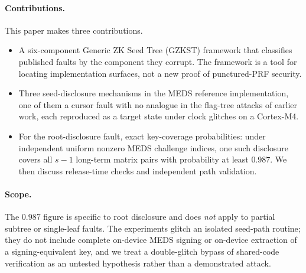 \paragraph{Contributions.}
This paper makes three contributions.
\begin{itemize}[leftmargin=*]
  \item A six-component Generic ZK Seed Tree (GZKST) framework that classifies
        published faults by the component they corrupt. The framework is a tool
        for locating implementation surfaces, not a new proof of punctured-PRF
        security.
  \item Three seed-disclosure mechanisms in the MEDS reference implementation,
        one of them a cursor fault with no analogue in the flag-tree attacks of
        earlier work, each reproduced as a target state under clock glitches on
        a Cortex-M4.
  \item For the root-disclosure fault, exact key-coverage probabilities: under
        independent uniform nonzero MEDS challenge indices, one such disclosure
        covers all $s-1$ long-term matrix pairs with probability at least
        $0.987$. We then discuss release-time checks and independent path
        validation.
\end{itemize}

\paragraph{Scope.}
The $0.987$ figure is specific to root disclosure and does \emph{not} apply to
partial subtree or single-leaf faults. The experiments glitch an isolated
seed-path routine; they do not include complete on-device MEDS signing or
on-device extraction of a signing-equivalent key, and we treat a double-glitch
bypass of shared-code verification as an untested hypothesis rather than a
demonstrated attack.

